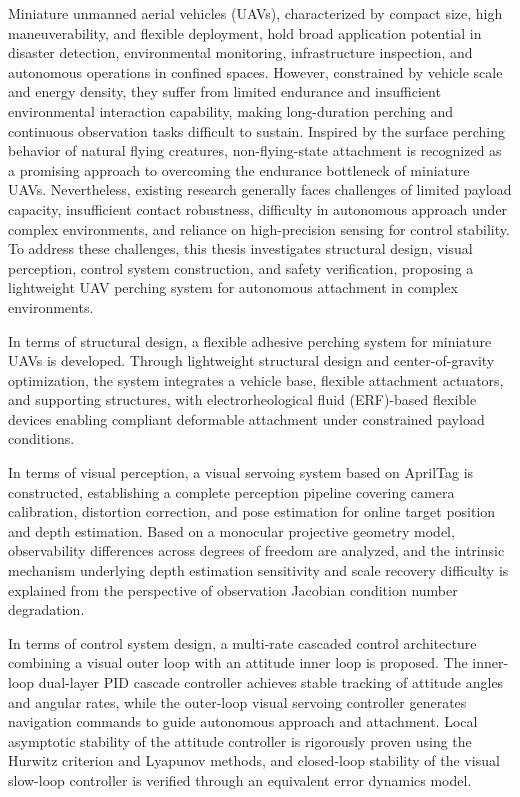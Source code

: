 \begin{abstract*}
Miniature unmanned aerial vehicles (UAVs), characterized by compact size, high maneuverability, and flexible deployment, hold broad application potential in disaster detection, environmental monitoring, infrastructure inspection, and autonomous operations in confined spaces. However, constrained by vehicle scale and energy density, they suffer from limited endurance and insufficient environmental interaction capability, making long-duration perching and continuous observation tasks difficult to sustain. Inspired by the surface perching behavior of natural flying creatures, non-flying-state attachment is recognized as a promising approach to overcoming the endurance bottleneck of miniature UAVs. Nevertheless, existing research generally faces challenges of limited payload capacity, insufficient contact robustness, difficulty in autonomous approach under complex environments, and reliance on high-precision sensing for control stability. To address these challenges, this thesis investigates structural design, visual perception, control system construction, and safety verification, proposing a lightweight UAV perching system for autonomous attachment in complex environments.

In terms of structural design, a flexible adhesive perching system for miniature UAVs is developed. Through lightweight structural design and center-of-gravity optimization, the system integrates a vehicle base, flexible attachment actuators, and supporting structures, with electrorheological fluid (ERF)-based flexible devices enabling compliant deformable attachment under constrained payload conditions.

In terms of visual perception, a visual servoing system based on AprilTag is constructed, establishing a complete perception pipeline covering camera calibration, distortion correction, and pose estimation for online target position and depth estimation. Based on a monocular projective geometry model, observability differences across degrees of freedom are analyzed, and the intrinsic mechanism underlying depth estimation sensitivity and scale recovery difficulty is explained from the perspective of observation Jacobian condition number degradation.

In terms of control system design, a multi-rate cascaded control architecture combining a visual outer loop with an attitude inner loop is proposed. The inner-loop dual-layer PID cascade controller achieves stable tracking of attitude angles and angular rates, while the outer-loop visual servoing controller generates navigation commands to guide autonomous approach and attachment. Local asymptotic stability of the attitude controller is rigorously proven using the Hurwitz criterion and Lyapunov methods, and closed-loop stability of the visual slow-loop controller is verified through an equivalent error dynamics model.


\end{abstract*}
